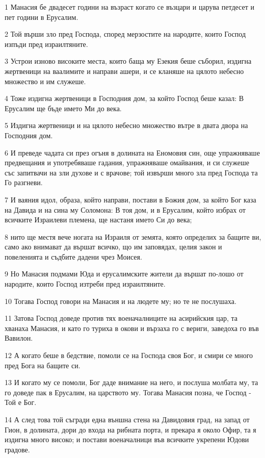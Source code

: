 \par 1 Манасия бе двадесет години на възраст когато се възцари и царува петдесет и пет години в Ерусалим.
\par 2 Той върши зло пред Господа, според мерзостите на народите, които Господ изпъди пред израилтяните.
\par 3 Устрои изново високите места, които баща му Езекия беше съборил, издигна жертвеници на ваалимите и направи ашери, и се кланяше на цялото небесно множество и им служеше.
\par 4 Тоже издигна жертвеници в Господния дом, за който Господ беше казал: В Ерусалим ще бъде името Ми до века.
\par 5 Издигна жертвеници и на цялото небесно множество вътре в двата двора на Господния дом.
\par 6 И преведе чадата си през огъня в долината на Еномовия син, още упражняваше предвещания и употребяваше гадания, упражняваше омайвания, и си служеше със запитвачи на зли духове и с врачове; той извърши много зла пред Господа та Го разгневи.
\par 7 И ваяния идол, образа, който направи, постави в Божия дом, за който Бог каза на Давида и на сина му Соломона: В тоя дом, и в Ерусалим, който избрах от всичките Израилеви племена, ще настаня името Си до века;
\par 8 нито ще местя вече ногата на Израиля от земята, която определих за бащите ви, само ако внимават да вършат всичко, що им заповядах, целия закон и повеленията и съдбите дадени чрез Моисея.
\par 9 Но Манасия подмами Юда и ерусалимските жители да вършат по-лошо от народите, които Господ изтреби пред израилтяните.
\par 10 Тогава Господ говори на Манасия и на людете му; но те не послушаха.
\par 11 Затова Господ доведе против тях военачалниците на асирийския цар, та хванаха Манасия, и като го туриха в окови и вързаха го с вериги, заведоха го във Вавилон.
\par 12 А когато беше в бедствие, помоли се на Господа своя Бог, и смири се много пред Бога на бащите си.
\par 13 И когато му се помоли, Бог даде внимание на него, и послуша молбата му, та го доведе пак в Ерусалим, на царството му. Тогава Манасия позна, че Господ - Той е Бог.
\par 14 А след това той съгради една външна стена на Давидовия град, на запад от Гион, в долината, дори до входа на рибната порта, и прекара я около Офир, та я издигна много високо; и постави военачалници във всичките укрепени Юдови градове.
